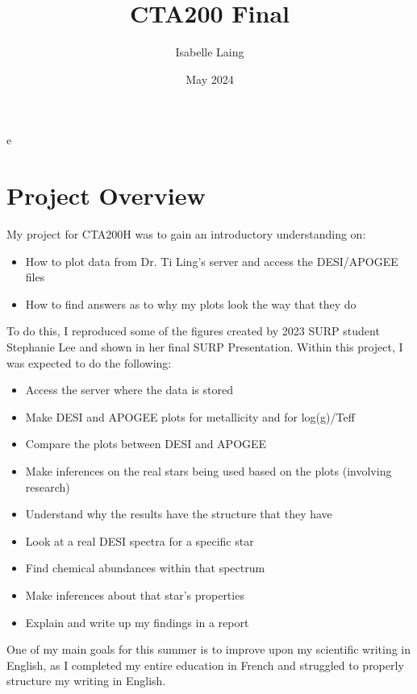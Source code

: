 e\documentclass{article}
\title{CTA200 Final}
\author{Isabelle Laing}
\date{May 2024}
\begin{document}
\maketitle

\section*{Project Overview}
My project for CTA200H was to gain an introductory understanding on:
\begin{itemize}
    \item How to plot data from Dr. Ti Ling’s server and access the DESI/APOGEE files
    \item How to find answers as to why my plots look the way that they do
\end{itemize}

To do this, I reproduced some of the figures created by 2023 SURP student Stephanie Lee and shown in her final SURP Presentation. Within this project, I was expected to do the following:
\begin{itemize}
    \item Access the server where the data is stored
    \item Make DESI and APOGEE plots for metallicity and for log(g)/Teff
    \item Compare the plots between DESI and APOGEE
    \item Make inferences on the real stars being used based on the plots (involving research)
    \item Understand why the results have the structure that they have
    \item Look at a real DESI spectra for a specific star
    \item Find chemical abundances within that spectrum
    \item Make inferences about that star’s properties
    \item Explain and write up my findings in a report
\end{itemize}

One of my main goals for this summer is to improve upon my scientific writing in English, as I completed my entire education in French and struggled to properly structure my writing in English.
\end{document}
